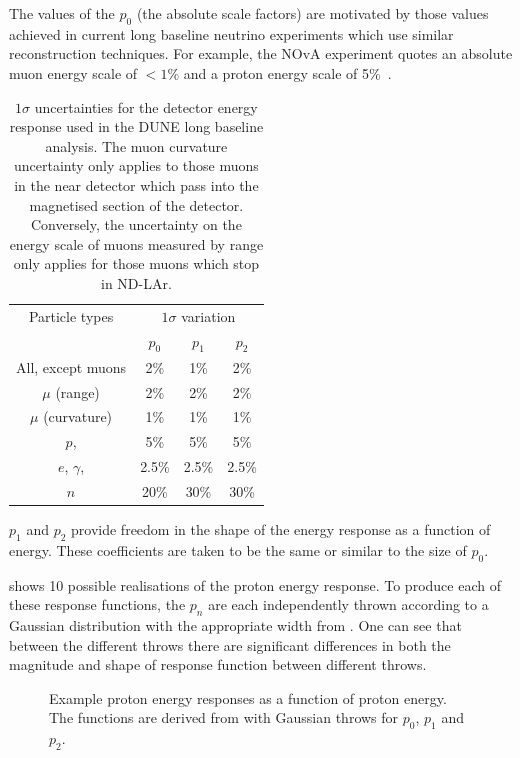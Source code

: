 The values of the $p_{0}$ (the absolute scale factors) are motivated by those values achieved in current long baseline neutrino experiments which use similar reconstruction techniques.
For example, the NOvA experiment quotes an absolute muon energy scale of $<1\%$ and a proton energy scale of 5\%~\cite{nova2018}.

\begin{table}
	\caption[$1\sigma$ uncertainties for the detector energy response used in the DUNE long baseline analysis]{$1\sigma$ uncertainties for the detector energy response used in the DUNE long baseline analysis. The muon curvature uncertainty only applies to those muons in the near detector which pass into the magnetised section of the detector. Conversely, the uncertainty on the energy scale of muons measured by range only applies for those muons which stop in ND-LAr.}
	\label{tab:energyScaleParams}
	\centering
	\begin{tabular}{c c c c}
		\hline
		\hline
		Particle types & \multicolumn{3}{c}{$1\sigma$ variation} \\
		& $p_{0}$ & $p_{1}$ & $p_{2}$ \\
		\hline
		All, except muons      & 2\%   & 1\%   & 2\%   \\
		$\mu$ (range)          & 2\%   & 2\%   & 2\%   \\
		$\mu$ (curvature)      & 1\%   & 1\%   & 1\%   \\
		$p$, \pipm             & 5\%   & 5\%   & 5\%   \\
		$e$, $\gamma$, \pizero & 2.5\% & 2.5\% & 2.5\% \\
		$n$                    & 20\%  & 30\%  & 30\% \\
		\hline
	\end{tabular}
\end{table}

$p_{1}$ and $p_{2}$ provide freedom in the shape of the energy response as a function of energy.
These coefficients are taken to be the same or similar to the size of $p_{0}$.

 shows 10 possible realisations of the proton energy response.
To produce each of these response functions, the $p_{n}$ are each independently thrown according to a Gaussian distribution with the appropriate width from .
One can see that between the different throws there are significant differences in both the magnitude and shape of response function between different throws.

\begin{figure}[h]
	\begin{adjustbox}{max totalsize=.6\textwidth, center}
		
	\end{adjustbox}
	\caption[Example proton energy responses as a function of proton energy.]{Example proton energy responses as a function of proton energy. The functions are derived from  with Gaussian throws for $p_{0}$, $p_{1}$ and $p_{2}$.}
	\label{fig:protonEScale}
\end{figure}

